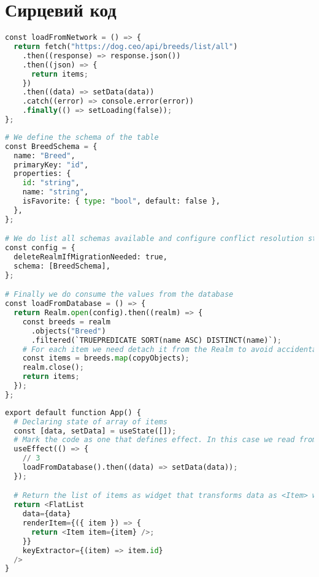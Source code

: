 \appendix
\renewcommand{\appendixname}{Додаток}


\chapter{Сирцевий код}
\label{cha:appendix1}

\begin{lstlisting}[style=light, language=Python,label={lst:rn_network},caption=React Native Network Call]
const loadFromNetwork = () => {
  return fetch("https://dog.ceo/api/breeds/list/all")
    .then((response) => response.json())
    .then((json) => {
      return items;
    })
    .then((data) => setData(data))
    .catch((error) => console.error(error))
    .finally(() => setLoading(false));
};
\end{lstlisting}

\begin{lstlisting}[style=light, language=Python,label={lst:rn_realm},caption=React Native Realm]
# We define the schema of the table
const BreedSchema = {
  name: "Breed",
  primaryKey: "id",
  properties: {
    id: "string",
    name: "string",
    isFavorite: { type: "bool", default: false },
  },
};

# We do list all schemas available and configure conflict resolution strategy
const config = {
  deleteRealmIfMigrationNeeded: true,
  schema: [BreedSchema],
};

# Finally we do consume the values from the database
const loadFromDatabase = () => {
  return Realm.open(config).then((realm) => {
    const breeds = realm
      .objects("Breed")
      .filtered(`TRUEPREDICATE SORT(name ASC) DISTINCT(name)`);
    # For each item we need detach it from the Realm to avoid accidental mutations
    const items = breeds.map(copyObjects);
    realm.close();
    return items;
  });
};
\end{lstlisting}

\begin{lstlisting}[style=light, language=Python,label={lst:rn_state_hooks},caption=React Native Hooks]
export default function App() {
  # Declaring state of array of items
  const [data, setData] = useState([]);
  # Mark the code as one that defines effect. In this case we read from DB.
  useEffect(() => {
    // 3
    loadFromDatabase().then((data) => setData(data));
  });

  # Return the list of items as widget that transforms data as <Item> widget
  return <FlatList
    data={data}
    renderItem={({ item }) => {
      return <Item item={item} />;
    }}
    keyExtractor={(item) => item.id}
  />
}
\end{lstlisting}
